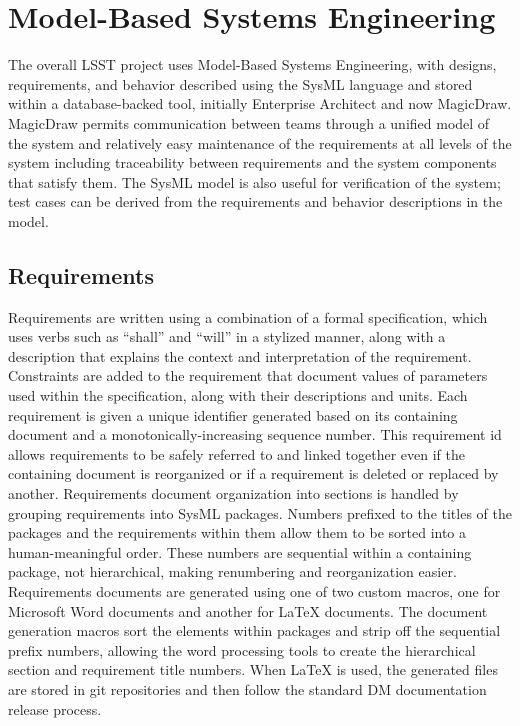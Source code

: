 \section{Model-Based Systems Engineering}

The overall LSST project uses Model-Based Systems Engineering\cite{2014SPIE.9150E..0MC}, with designs, requirements, and behavior described using the SysML language and stored within a database-backed tool, initially Enterprise Architect and now MagicDraw.
MagicDraw permits communication between teams through a unified model of the system and
relatively easy maintenance of the requirements at all levels of the system including traceability between requirements and the system components that satisfy them.
The SysML model is also useful for verification of the system; test cases can be derived from the requirements and behavior descriptions in the model.

\subsection{Requirements}

Requirements are written using a combination of a formal specification, which uses verbs such as ``shall'' and ``will'' in a stylized manner, along with a description that explains the context and interpretation of the requirement.
Constraints are added to the requirement that document values of parameters used within the specification, along with their descriptions and units.
Each requirement is given a unique identifier generated based on its containing document and a monotonically-increasing sequence number.
This requirement id allows requirements to be safely referred to and linked together even if the containing document is reorganized or if a requirement is deleted or replaced by another.
Requirements document organization into sections is handled by grouping requirements into SysML packages.
Numbers prefixed to the titles of the packages and the requirements within them allow them to be sorted into a human-meaningful order.
These numbers are sequential within a containing package, not hierarchical, making renumbering and reorganization easier.
Requirements documents are generated using one of two custom macros, one for Microsoft Word documents and another for LaTeX documents.
The document generation macros sort the elements within packages and strip off the sequential prefix numbers, allowing the word processing tools to create the hierarchical section and requirement title numbers.
When LaTeX is used, the generated files are stored in git repositories and then follow the standard DM documentation release process.

